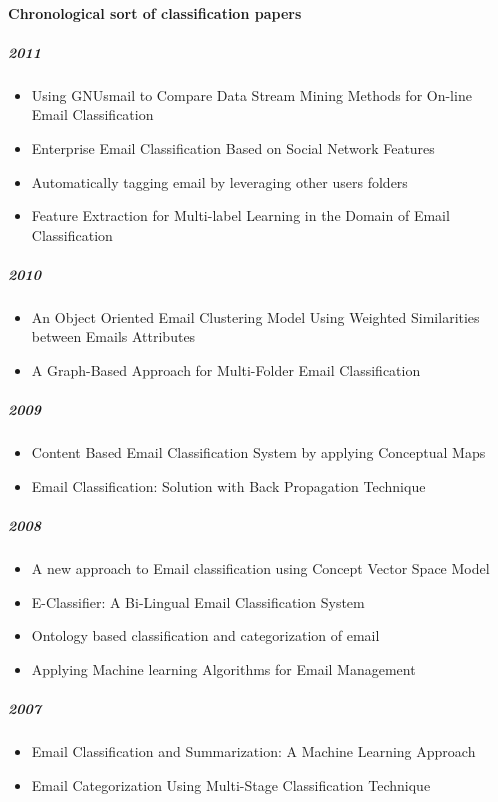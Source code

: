 \documentclass[12pt]{article}
\begin{document}
\newpage
\paragraph{Chronological sort of classification papers}
\subparagraph{2011}
\begin{itemize}
\item Using GNUsmail to Compare Data Stream Mining Methods for On-line Email Classification
\item Enterprise Email Classification Based on Social Network Features
\item Automatically tagging email by leveraging other users folders
\item Feature Extraction for Multi-label Learning in the Domain of Email Classification
\end{itemize}

\subparagraph{2010}
\begin{itemize}
\item An Object Oriented Email Clustering Model Using Weighted Similarities between Emails Attributes
\item A Graph-Based Approach for Multi-Folder Email Classification
\end{itemize}

\subparagraph{2009}
\begin{itemize}
\item Content Based Email Classification System by applying Conceptual Maps
\item Email Classification: Solution with Back Propagation Technique
\end{itemize}

\subparagraph{2008}
\begin{itemize}
\item A new approach to Email classification using Concept Vector Space Model
\item E-Classifier: A Bi-Lingual Email Classification System
\item Ontology based classification and categorization of email
\item Applying Machine learning Algorithms for Email Management
\end{itemize}

\subparagraph{2007}
\begin{itemize}
\item Email Classification and Summarization: A Machine Learning Approach
\item Email Categorization Using Multi-Stage Classification Technique
\end{itemize}
\end{document}
